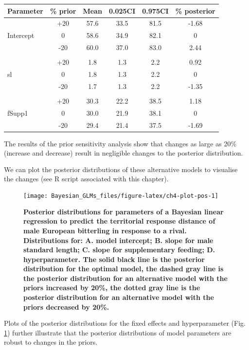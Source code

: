 \documentclass[
]{book}
\begin{document}
\begin{longtable}[]{@{}lccccc@{}}
\toprule
Parameter & \% prior & Mean & 0.025CI & 0.975CI & \% posterior \\
\midrule
\endhead
& +20 & 57.6 & 33.5 & 81.5 & -1.68 \\
Intercept & 0 & 58.6 & 34.9 & 82.1 & 0 \\
& -20 & 60.0 & 37.0 & 83.0 & 2.44 \\
& & & & & \\
& +20 & 1.8 & 1.3 & 2.2 & 0.92 \\
sl & 0 & 1.8 & 1.3 & 2.2 & 0 \\
& -20 & 1.7 & 1.3 & 2.2 & -1.35 \\
& & & & & \\
& +20 & 30.3 & 22.2 & 38.5 & 1.18 \\
fSupp1 & 0 & 30.0 & 21.9 & 38.1 & 0 \\
& -20 & 29.4 & 21.4 & 37.5 & -1.69 \\
\bottomrule
\end{longtable}

The results of the prior sensitivity analysis show that changes as large as 20\% (increase and decrease) result in negligible changes to the posterior distribution.

We can plot the posterior distributions of these alternative models to visualise the changes (see R script associated with this chapter).



\begin{figure}

{\centering \texttt{[image: Bayesian\_GLMs\_files/figure-latex/ch4-plot-pos-1]} 

}

\caption{\textbf{Posterior distributions for parameters of a Bayesian linear regression to predict the territorial response distance of male European bitterling in response to a rival. Distributions for: A. model intercept; B. slope for male standard length; C. slope for supplementary feeding; D. hyperparameter. The solid black line is the posterior distribution for the optimal model, the dashed gray line is the posterior distribution for an alternative model with the priors increased by 20\%, the dotted gray line is the posterior distribution for an alternative model with the priors decreased by 20\%.}}\label{fig:ch4-plot-pos}
\end{figure}

Plots of the posterior distributions for the fixed effects and hyperparameter (Fig. \ref{fig:ch4-plot-pos}) further illustrate that the posterior distributions of model parameters are robust to changes in the priors.
\end{document}

